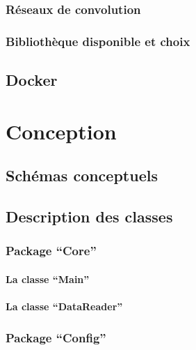 \documentclass[a4paper,10pt,openany,oneside]{sphinxmanual}
\begin{document}
\subsection{Réseaux de convolution}
\label{index:reseaux-de-convolution}

\subsection{Bibliothèque disponible et choix}
\label{index:bibliotheque-disponible-et-choix}

\section{Docker}
\label{index:docker}

\chapter{Conception}
\label{index:conception}

\section{Schémas conceptuels}
\label{index:schemas-conceptuels}

\section{Description des classes}
\label{index:description-des-classes}

\subsection{Package ``Core''}
\label{index:package-core}

\subsubsection{La classe ``Main''}
\label{index:la-classe-main}

\subsubsection{La classe ``DataReader''}
\label{index:la-classe-datareader}

\subsection{Package ``Config''}
\label{index:package-config}
\end{document}
